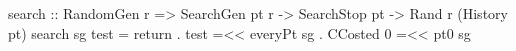 search :: RandomGen r
       => SearchGen pt r -> SearchStop pt -> Rand r (History pt)
search sg test = return . test =<< everyPt sg . CCosted 0 =<< pt0 sg
